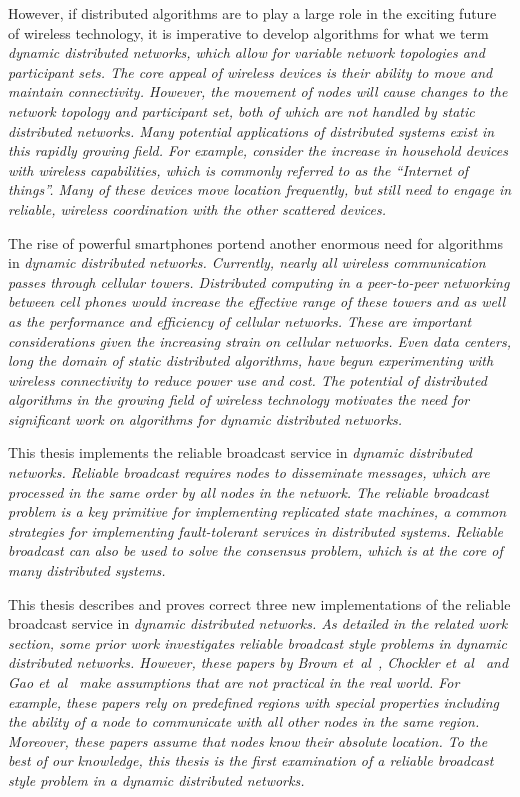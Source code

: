 \documentclass[english]{article}
\begin{document}
However, if distributed algorithms are to play a large role in the exciting future of wireless technology, it is imperative to develop algorithms for what we term \em dynamic distributed networks\em, which allow for variable network topologies and participant sets. The core appeal of wireless devices is their ability to move and maintain connectivity. However, the movement of nodes will cause changes to the network topology and participant set, both of which are not handled by \em static distributed networks\em. Many potential applications of distributed systems exist in this rapidly growing field. For example, consider the increase in household devices with wireless capabilities, which is commonly referred to as the ``Internet of things''. Many of these devices move location frequently, but still need to engage in reliable, wireless coordination with the other scattered devices.

The rise of powerful smartphones portend another enormous need for algorithms in \em dynamic distributed networks\em. Currently, nearly all wireless communication passes through cellular towers. Distributed computing in a peer-to-peer networking between cell phones would increase the effective range of these towers and as well as the performance and efficiency of cellular networks. These are important considerations given the increasing strain on cellular networks. Even data centers, long the domain of static distributed algorithms, have begun experimenting with wireless connectivity to reduce power use and cost. The potential of distributed algorithms in the growing field of wireless technology motivates the need for significant work on algorithms for \em dynamic distributed networks\em.

This thesis implements the reliable broadcast service in \em dynamic distributed networks\em. Reliable broadcast requires nodes to disseminate messages, which are processed in the same order by all nodes in the network. The reliable broadcast problem is a key primitive for implementing replicated state machines, a common strategies for implementing fault-tolerant services in distributed systems. Reliable broadcast can also be used to solve the consensus problem, which is at the core of many distributed systems.

This thesis describes and proves correct three new implementations of the reliable broadcast service in \em dynamic distributed networks\em. As detailed in the related work section, some prior work investigates reliable broadcast style problems in \em dynamic distributed networks\em. However, these papers by Brown et~al~\cite{Brown:2007}, Chockler et~al~\cite{Chockler:2008} and Gao et~al~\cite{Gao:2012} make assumptions that are not practical in the real world. For example, these papers rely on predefined regions with special properties including the ability of a node to communicate with all other nodes in the same region. Moreover, these papers assume that nodes know their absolute location. To the best of our knowledge, this thesis is the first examination of a reliable broadcast style problem in a \em dynamic distributed networks\em.
\end{document}
